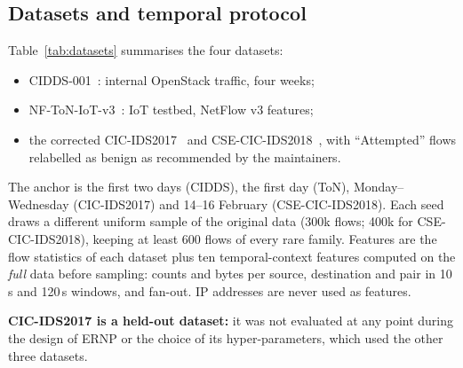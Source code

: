 \documentclass[preprint,12pt]{elsarticle}
\begin{document}
\subsection{Datasets and temporal protocol}
Table~\ref{tab:datasets} summarises the four datasets:
\begin{itemize}
\item CIDDS-001~\cite{ring2017cidds}: internal OpenStack traffic, four weeks;
\item NF-ToN-IoT-v3~\cite{moustafa2021toniot,luay2025netflowv3}: IoT testbed, NetFlow v3 features;
\item the corrected CIC-IDS2017~\cite{sharafaldin2018cicids,engelen2021troubleshooting} and CSE-CIC-IDS2018~\cite{liu2022error}, with ``Attempted'' flows relabelled as benign as recommended by the maintainers.
\end{itemize}

The anchor is the first two days (CIDDS), the first day (ToN), Monday--Wednesday (CIC-IDS2017) and 14--16 February (CSE-CIC-IDS2018). Each seed draws a different uniform sample of the original data (300k flows; 400k for CSE-CIC-IDS2018), keeping at least 600 flows of every rare family. Features are the flow statistics of each dataset plus ten temporal-context features computed on the \emph{full} data before sampling: counts and bytes per source, destination and pair in 10\,s and 120\,s windows, and fan-out. IP addresses are never used as features.

\textbf{CIC-IDS2017 is a held-out dataset:} it was not evaluated at any point during the design of ERNP or the choice of its hyper-parameters, which used the other three datasets.

\begin{table}[t]
\centering\small
\caption{Datasets (seed-0 streams). Known families occur in the anchor; zero-day families first occur afterwards. $^\dagger$Held out during method development.}\label{tab:datasets}
\resizebox{\linewidth}{!}{}
\end{table}
\end{document}
